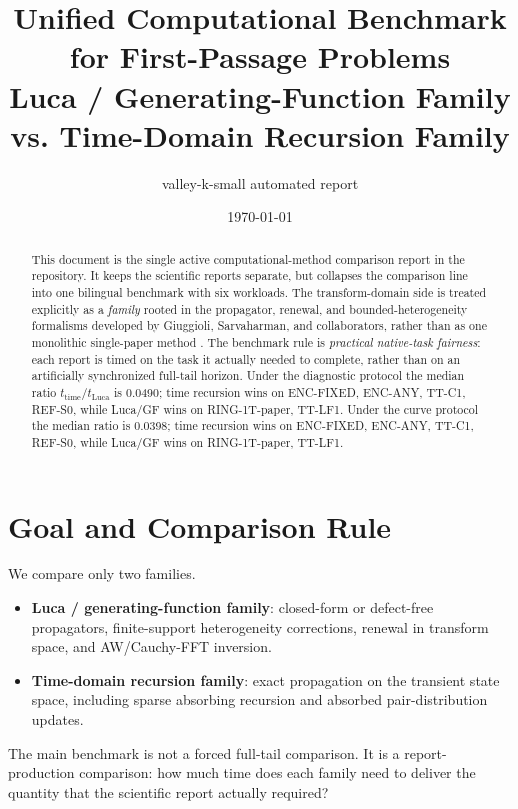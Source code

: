 \documentclass[11pt]{article}
\title{Unified Computational Benchmark for First-Passage Problems\\Luca / Generating-Function Family vs. Time-Domain Recursion Family}
\author{valley-k-small automated report}
\date{\today}
\begin{document}
\maketitle
\begin{abstract}
This document is the single active computational-method comparison report in the repository. 
It keeps the scientific reports separate, but collapses the comparison line into one bilingual benchmark with six workloads. 
The transform-domain side is treated explicitly as a \emph{family} rooted in the propagator, renewal, and bounded-heterogeneity formalisms developed by Giuggioli, Sarvaharman, and collaborators, rather than as one monolithic single-paper method \cite{pre102_062124_2020,prr5_043281_2023,jstat_013201_2023,review_2311_00464_2023}. 
The benchmark rule is \emph{practical native-task fairness}: each report is timed on the task it actually needed to complete, rather than on an artificially synchronized full-tail horizon. 
Under the diagnostic protocol the median ratio $t_{\mathrm{time}}/t_{\mathrm{Luca}}$ is 0.0490; 
time recursion wins on ENC-FIXED, ENC-ANY, TT-C1, REF-S0, while Luca/GF wins on RING-1T-paper, TT-LF1. 
Under the curve protocol the median ratio is 0.0398; 
time recursion wins on ENC-FIXED, ENC-ANY, TT-C1, REF-S0, while Luca/GF wins on RING-1T-paper, TT-LF1.
\end{abstract}
\section{Goal and Comparison Rule}
We compare only two families.
\begin{itemize}[leftmargin=1.4em]
\item \textbf{Luca / generating-function family}: closed-form or defect-free propagators, finite-support heterogeneity corrections, renewal in transform space, and AW/Cauchy-FFT inversion.
\item \textbf{Time-domain recursion family}: exact propagation on the transient state space, including sparse absorbing recursion and absorbed pair-distribution updates.
\end{itemize}
The main benchmark is not a forced full-tail comparison. It is a report-production comparison: how much time does each family need to deliver the quantity that the scientific report actually required?
\end{document}
